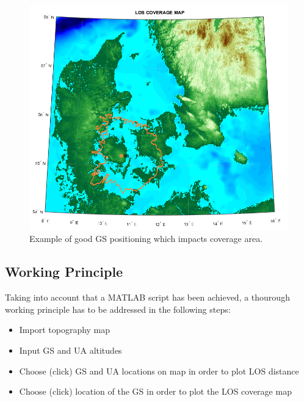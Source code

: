 \begin{figure}[H]
	\centering
	\includegraphics[scale=0.67]{figures/los_odense.png}
	\caption{Example of good GS positioning which impacts coverage area.}
   	\label{fig:los_odense}
\end{figure}

\subsection{Working Principle}
Taking into account that a MATLAB script has been achieved, a thourough working principle has to be addressed in the following steps:
\begin{itemize}
	\item Import topography map 
	\item Input GS and UA altitudes
	\item Choose (click) GS and UA locations on map in order to plot LOS distance
	\item Choose (click) location of the GS in order to plot the LOS coverage map
\end{itemize}